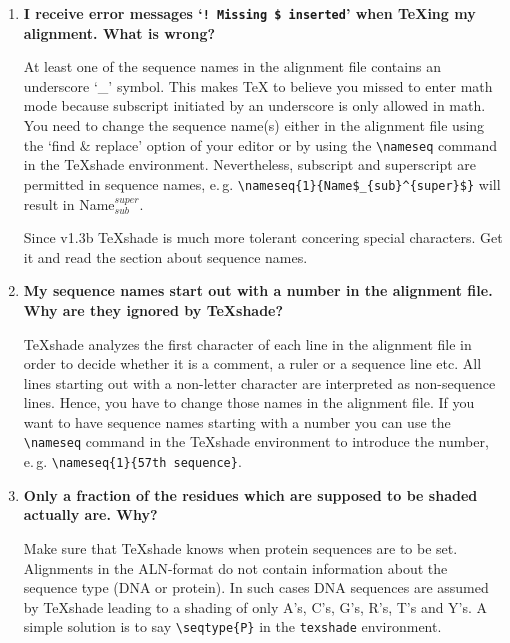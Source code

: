\documentclass[12pt]{article}
\begin{document}
\begin{enumerate}
    \item
    
    \textbf{I receive error messages `\texttt{!\ Missing \$ inserted}' 
    when \TeX{}ing my alignment. What is wrong?}
    
    At least one of the sequence names in the alignment file contains an
    underscore `\_' symbol. This makes \TeX{} to believe you missed to 
    enter math mode because subscript initiated by an underscore is 
    only allowed in math. You need to change the sequence name(s) either in the 
    alignment file using the `find \& replace' option of your editor or 
    by using the \verb|\nameseq| command in the \TeX{}shade environment. 
    Nevertheless, subscript and superscript are permitted in sequence names, 
    e.\,g. \verb|\nameseq{1}{Name$_{sub}^{super}$}| will result in 
    Name$_{sub}^{super}$.
    
    Since v1.3b \TeX{}shade{} is much more tolerant concering special
    characters. Get it and read the section about sequence names.
    
    
    \item
    
    \textbf{My sequence names start out with a number in the 
    alignment file. Why are they ignored by \TeX{}shade?}
    
    \TeX{}shade analyzes the first character of each line in the 
    alignment file in order to decide whether it is a comment, a 
    ruler or a sequence line etc. All lines starting out with a 
    non-letter character are interpreted as non-sequence lines. Hence, 
    you have to change those names in the alignment file. If you 
    want to have sequence names starting with a number you can  
    use the \verb|\nameseq| command in the \TeX{}shade environment to 
    introduce the number, e.\,g. \verb|\nameseq{1}{57th sequence}|.
    
    
    \item
    
    \textbf{Only a fraction of the residues which are supposed to be
    shaded actually are. Why?}
    
    Make sure that \TeX{}shade knows when protein sequences are to be 
    set. Align\-ments in the ALN-format do not contain information about the
    sequence type (DNA or protein). In such cases DNA sequences are
    assumed by \TeX{}shade leading to a shading of only A's, C's, G's, 
    R's, T's and Y's. A simple solution is to say \verb|\seqtype{P}| in the 
    \verb|texshade| environment.
    

\end{enumerate}
\end{document}
